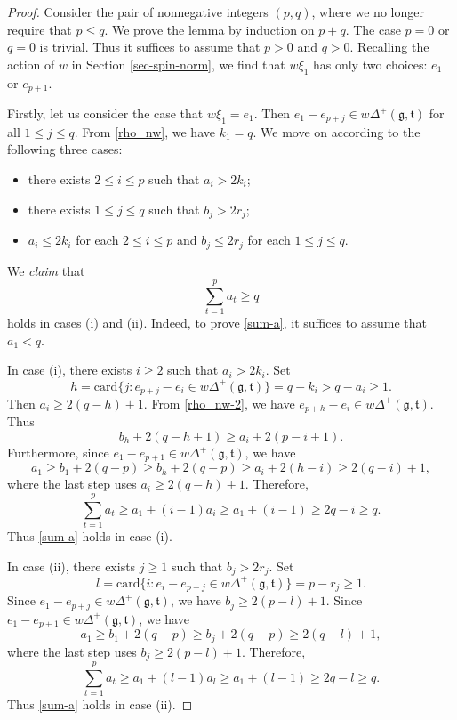 \documentclass[11pt]{amsart}
\theoremstyle{plain}
\theoremstyle{definition}
\newcommand{\frg}{\mathfrak{g}}
\newcommand{\frt}{\mathfrak{t}}
\begin{document}
\begin{proof}
	Consider the pair of nonnegative integers $(p,q)$, where we no longer require that $p\le q$. We prove the lemma by induction on $p+q$. The case $p=0$ or $q=0$ is trivial. Thus it suffices to assume that $p>0$ and $q>0$. Recalling the action of $w$ in Section \ref{sec-spin-norm}, we find that  $w\xi_1$ has only two choices: $e_1$ or $e_{p+1}$.

Firstly, let us consider the case that  $w\xi_1=e_1$. Then $e_1-e_{p+j}\in w\Delta^+(\frg, \frt)$ for all $1\le j\le q$. From \eqref{rho_nw}, we have $k_1=q$. We move on according to the following three cases:
\begin{itemize}
\item[(i)]  there exists $2\leq i\leq p$ such that $a_i>2 k_i$;
\item[(ii)] there exists $1\leq j\leq q$ such that $b_j>2 r_j$;
\item[(iii)] $a_i\leq 2 k_i$ for each $2\leq i\leq p$ and $b_j\leq 2 r_j$ for each $1\leq j\leq q$.
\end{itemize}

We \emph{claim} that
		\begin{equation}\label{sum-a}
		\sum_{t=1}^p a_t\ge q
	\end{equation}
holds in cases (i) and (ii).
	Indeed, to prove \eqref{sum-a}, it suffices to assume that $a_1<q$.

In case (i), there exists $i\ge 2$ such that $a_i>2k_i$. Set
	\[h=\mathrm{card}\{j:e_{p+j}-e_i\in w\Delta^+(\frg, \frt)\}=q-k_i>q-a_i\ge 1.\]
	Then $a_i\ge 2(q-h)+1$. From \eqref{rho_nw-2}, we have $e_{p+h}-e_i\in w\Delta^+(\frg, \frt)$. Thus
	\[b_{h}+2(q-h+1)\ge a_i+2(p-i+1).	\]
	Furthermore, since $e_1-e_{p+1}\in w\Delta^+(\frg, \frt)$, we have
		\[a_1\ge b_1+2(q-p)\ge b_{h}+2(q-p)\ge a_i+2(h-i)\ge 2(q-i)+1,\]
	where the last step uses $a_i\ge 2(q-h)+1$. Therefore,
		\[\sum_{t=1}^p a_t\ge a_1+(i-1)a_i\ge a_1+(i-1)\ge 2q-i\ge q.\]
	Thus \eqref{sum-a} holds in case (i).
	
	In case (ii), there exists $j\ge 1$ such that $b_j>2r_j$. Set
	\[l=\mathrm{card}\{i:e_i-e_{p+j}\in w\Delta^+(\frg, \frt)\}=p-r_j\ge 1.\]
	Since $e_1-e_{p+j}\in w\Delta^+(\frg, \frt)$, we have $b_j\ge 2(p-l)+1$. Since $e_1-e_{p+1}\in w\Delta^+(\frg, \frt)$, we have
	\[a_1\ge b_1+2(q-p)\ge b_j+2(q-p)\ge  2(q-l)+1,\]
	where the last step uses $b_j\ge 2(p-l)+1$. Therefore,
		\[\sum_{t=1}^p a_t\ge a_1+(l-1)a_l\ge a_1+(l-1)\ge 2q-l\ge q.\]
	Thus \eqref{sum-a} holds in case (ii).
	

\end{proof}
\end{document}

